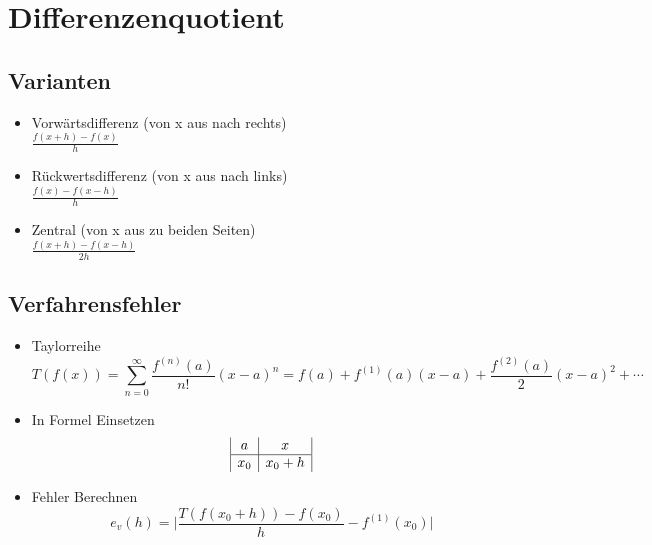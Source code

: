 \section{Differenzenquotient}

\subsection{Varianten}
\begin{itemize}

	\item Vorwärtsdifferenz (von x aus nach rechts) \\
	$\frac{f(x + h) - f(x)}{h}$
	
	\item Rückwertsdifferenz (von x aus nach links) \\
	$\frac{f(x) - f(x - h)}{h}$
	
	\item Zentral (von x aus zu beiden Seiten) \\
	$\frac{f(x + h) - f(x - h)}{2h}$

\end{itemize}

\subsection{Verfahrensfehler}
\begin{itemize}

	\item Taylorreihe \\
	\begin{equation*}
		T(f(x)) = \sum_{n=0}^{\infty}\frac{f^{(n)}(a)}{n!} (x - a)^n 
		= f(a) + f^{(1)}(a)(x - a) + \frac{f^{(2)}(a)}{2} (x - a)^2 + \cdots
	\end{equation*}
	
	\item In Formel Einsetzen \\
	\begin{displaymath}
		\begin{array}{| c | c |}
			a & x \\
			\hline
			x_0 & x_0 + h \\
		\end{array}
	\end{displaymath}
	
	\item Fehler Berechnen \\
	\begin{equation*}
		e_v(h) = \bigg| \frac{T(f(x_0 + h)) - f(x_0)}{h} - f^{(1)}(x_0) \bigg|	
	\end{equation*}

\end{itemize}


